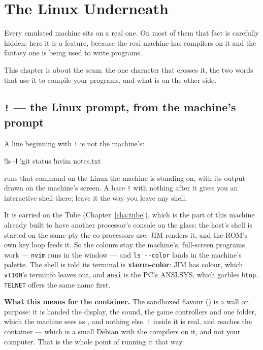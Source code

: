 \chapter{The Linux Underneath}\label{cha:linux}

Every emulated machine sits on a real one. On most of them that fact is
carefully hidden; here it is a feature, because the real machine has
compilers on it and the fantasy one is being used to write programs.

This chapter is about the seam: the one character that crosses it, the
two words that use it to compile your programs, and what is on the other
side.

\section{\texttt{!} --- the Linux prompt, from the machine's prompt}
A line beginning with \verb|!| is not the machine's:

\begin{type}
!ls -l
!git status
!nvim notes.txt
\end{type}

\noindent runs that command on the Linux the machine is standing on, with
its output drawn on the machine's screen. A bare \verb|!| with nothing
after it gives you an interactive shell there; leave it the way you leave
any shell.

It is carried on the Tube (Chapter~\ref{cha:tube}), which is the part of
this machine already built to have another processor's console on the
glass: the host's shell is started on the same pty the co-processors use,
JIM renders it, and the ROM's own key loop feeds it. So the colours stay
the machine's, full-screen programs work --- \verb|nvim| runs in the
window --- and \verb|ls --color| lands in the machine's palette. The
shell is told its terminal is \textbf{xterm-color}: JIM has colour,
which \texttt{vt100}'s terminfo leaves out, and \texttt{ansi} is the
PC's ANSI.SYS, which garbles \verb|htop|. \verb|TELNET| offers the
same name first.

\begin{aside}
\textbf{What this means for the container.} The sandboxed flavour
() is a wall on purpose: it is handed the display,
the sound, the game controllers and one folder, which the machine sees
as , and nothing else. \verb|!| inside it is real, and
reaches the container --- which is a small Debian with the compilers on
it, and not your computer. That is the whole point of running it that
way.
\end{aside}

